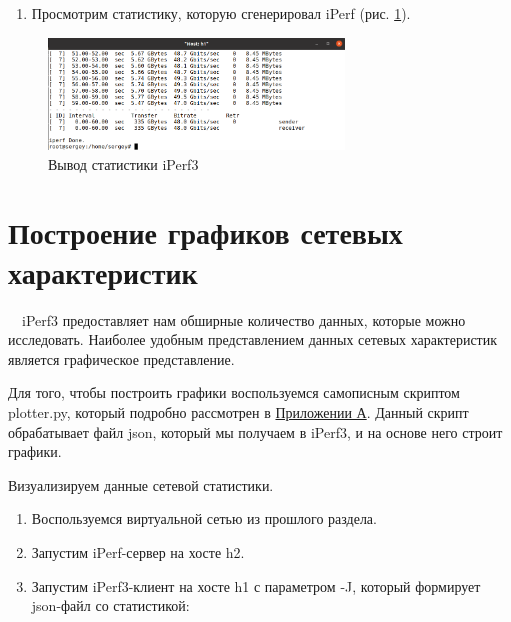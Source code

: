 \documentclass[
  13pt,
  fontsize=13pt,
  russian,
  a4paper,
,captions=tableheading
]{scrreprt}
\providecommand{\tightlist}{%
  \setlength{\itemsep}{0pt}\setlength{\parskip}{0pt}}
\begin{document}
\begin{enumerate}
\def\labelenumi{\arabic{enumi}.}
\setcounter{enumi}{3}
\tightlist
\item
  Просмотрим статистику, которую сгенерировал iPerf (рис.
  \ref{fig:0013}).
\end{enumerate}

\begin{figure}
\hypertarget{fig:0013}{%
\centering
\includegraphics[width=0.7\textwidth,height=\textheight]{iperf_4.png}
\caption{Вывод статистики iPerf3}\label{fig:0013}
}
\end{figure}

\hypertarget{ux43fux43eux441ux442ux440ux43eux435ux43dux438ux435-ux433ux440ux430ux444ux438ux43aux43eux432-ux441ux435ux442ux435ux432ux44bux445-ux445ux430ux440ux430ux43aux442ux435ux440ux438ux441ux442ux438ux43a}{%
\section{Построение графиков сетевых
характеристик}\label{ux43fux43eux441ux442ux440ux43eux435ux43dux438ux435-ux433ux440ux430ux444ux438ux43aux43eux432-ux441ux435ux442ux435ux432ux44bux445-ux445ux430ux440ux430ux43aux442ux435ux440ux438ux441ux442ux438ux43a}}

\(\quad\)iPerf3 предоставляет нам обширные количество данных, которые
можно исследовать. Наиболее удобным представлением данных сетевых
характеристик является графическое представление.

Для того, чтобы построить графики воспользуемся самописным скриптом
plotter.py, который подробно рассмотрен в
\protect\hyperlink{appendix1}{Приложении А}. Данный скрипт обрабатывает
файл json, который мы получаем в iPerf3, и на основе него строит
графики.

Визуализируем данные сетевой статистики.

\begin{enumerate}
\def\labelenumi{\arabic{enumi}.}
\tightlist
\item
  Воспользуемся виртуальной сетью из прошлого раздела.
\item
  Запустим iPerf-сервер на хосте h2.
\item
  Запустим iPerf3-клиент на хосте h1 с параметром -J, который формирует
  json-файл со статистикой:
\end{enumerate}
\end{document}
